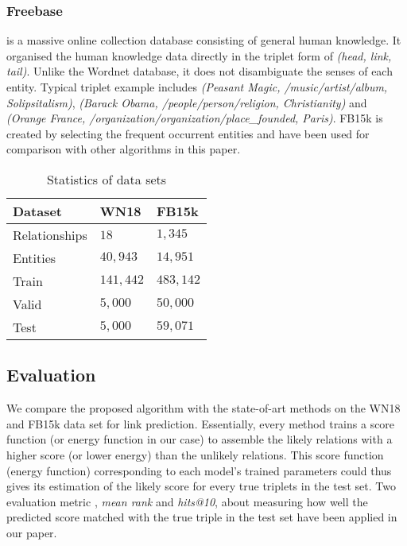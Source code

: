 \documentclass[10pt,journal]{IEEEtran}
\begin{document}
\subsubsection{Freebase} is a massive online collection database consisting of general human knowledge. It organised the human knowledge data  directly in the triplet form of \emph{(head, link, tail)}. Unlike the Wordnet database, it does not disambiguate the senses of each entity. Typical triplet example includes \emph{(Peasant Magic, /music/artist/album, Solipsitalism)}, \emph{(Barack Obama, /people/person/religion, Christianity)} and \emph{(Orange France, /organization/organization/place\_founded, Paris)}. FB15k \cite{bordes_learning_2011} is created by selecting the frequent occurrent entities and have been used for comparison with other algorithms in this paper.

\begin{table}[t]
\caption{Statistics of data sets} \label{data}
\centering
\begin{tabular}[center]{|l |l l |} 
 \hline
Dataset & WN18 & FB15k \\
 \hline 
Relationships & $18$ & $1,345$ \\
Entities & $40,943$ & $14,951$ \\
Train & $141,442$ & $483,142$ \\
Valid & $5,000$ & $50,000$ \\
Test & $5,000$ & $59,071$ \\
\hline
 \end{tabular}
 \end{table}
 
\subsection{Evaluation}
We compare the proposed algorithm with the state-of-art  methods on the WN18 and FB15k data set for link prediction. Essentially, every method trains a score function (or energy function in our case) to assemble the likely relations with a higher score (or lower energy) than the unlikely relations. This score function (energy function) corresponding to each model's trained parameters could thus gives its estimation of the likely score for every true triplets in the test set. Two evaluation metric \cite{bordes_learning_2011}, \emph{mean rank} and \emph{hits@10}, about measuring how well the predicted score matched with the true triple in the test set have been applied in our paper.
\end{document}
